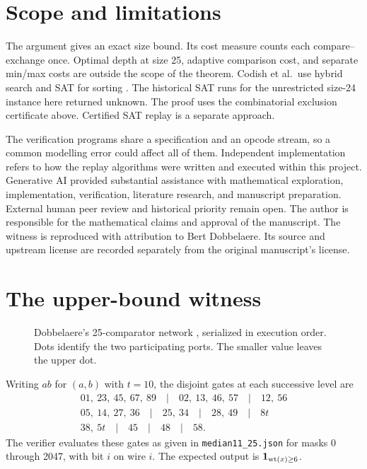 \section{Scope and limitations}
The argument gives an exact size bound. Its cost measure counts each compare--exchange once. Optimal depth at
size 25, adaptive comparison cost, and separate min/max costs are
outside the scope of the theorem.
Codish et al.\ use hybrid search and SAT for sorting \cite{codish}.
The historical SAT runs for the unrestricted size-24 instance here
returned unknown. The proof uses the combinatorial exclusion
certificate above. Certified SAT replay \cite{lrat} is a separate
approach.

The verification programs share a specification and an opcode stream,
so a common modelling error could affect all of them. Independent
implementation refers to how the replay algorithms were written and
executed within this project. Generative AI provided substantial
assistance with mathematical exploration, implementation,
verification, literature research, and manuscript preparation. External human
peer review and historical priority remain open. The author is responsible for the mathematical claims
and approval of the manuscript. The witness is reproduced with attribution to
Bert Dobbelaere. Its source and upstream license are recorded separately
from the original manuscript's license.

\appendix
\section{The upper-bound witness}
\begin{figure}[ht]
\centering
{}
\caption{Dobbelaere's 25-comparator network \cite{dobb}, serialized in
execution order. Dots identify the two participating ports. The smaller
value leaves the upper dot.}
\label{fig:net}
\end{figure}
Writing $ab$ for $(a,b)$ with $t=10$, the disjoint gates at each successive
level are
\[
\begin{gathered}
01,\ 23,\ 45,\ 67,\ 89 \quad|\quad 02,\ 13,\ 46,\ 57
 \quad|\quad 12,\ 56\\
05,\ 14,\ 27,\ 36 \quad|\quad 25,\ 34 \quad|\quad 28,\ 49
 \quad|\quad 8t\\
38,\ 5t \quad|\quad 45 \quad|\quad 48 \quad|\quad 58 .
\end{gathered}
\]
The verifier evaluates these gates as given in \texttt{median11\_25.json}
for masks 0 through 2047, with bit $i$ on wire $i$. The expected output is
$\mathbf{1}_{\operatorname{wt}(x)\ge6}$.
